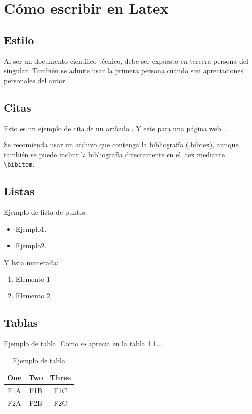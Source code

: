 \chapter{Cómo escribir en Latex}

\section{Estilo}

Al ser un documento científico-técnico, debe ser expuesto en tercera persona del singular. También se admite usar la primera persona cuando son apreciaciones personales del autor.

\section{Citas}


Esto es un ejemplo de cita de un artículo \cite{Brunete:2013}. Y este para una página web \cite{google2018}.

Se recomienda usar un archivo que contenga la bibliografía (.bibtex), aunque también se puede incluir la bibliografía directamente en el .tex mediante \verb=\bibitem=.


\section{Listas}

Ejemplo de lista de puntos:
\begin{itemize}
\item Ejemplo1.
\item Ejemplo2.
\end{itemize} 

Y lista numerada:
\begin{enumerate}
\item Elemento 1
\item Elemento 2
\end{enumerate}

\section{Tablas}

Ejemplo de tabla. Como se aprecia en la tabla \ref{tab:table_example}...
\begin{table}[tb]
\caption{Ejemplo de tabla}
\label{tab:table_example}
\begin{center}
\begin{tabular}{|c||c|c|}
\hline
One & Two & Three\\
\hline
\hline
F1A & F1B & F1C\\
F2A & F2B & F2C\\
\hline
\end{tabular}
\end{center}
\end{table}

